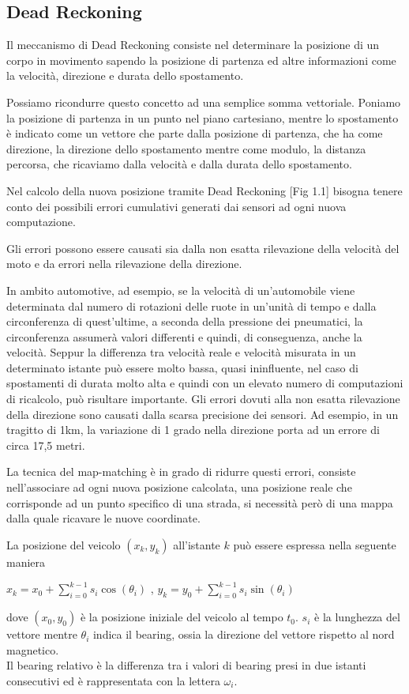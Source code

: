 \documentclass[12pt,a4paper,openright,twoside]{report}
\begin{document}
\subsection{Dead Reckoning}
Il meccanismo di Dead Reckoning consiste nel determinare la posizione di un corpo in movimento sapendo la posizione di partenza ed altre informazioni come la velocità, direzione e durata dello spostamento.

Possiamo ricondurre questo concetto ad una semplice somma vettoriale. Poniamo la posizione di partenza in un punto nel piano cartesiano, mentre lo spostamento è indicato come un vettore che parte dalla posizione di partenza, che ha come direzione, la direzione dello spostamento mentre come modulo, la distanza percorsa, che ricaviamo dalla velocità e dalla durata dello spostamento.

Nel calcolo della nuova posizione tramite Dead Reckoning [Fig 1.1] bisogna tenere conto dei possibili errori cumulativi generati dai sensori ad ogni nuova computazione. 

Gli errori possono essere causati sia dalla non esatta rilevazione della velocità del moto e da errori nella rilevazione della direzione.

In ambito automotive, ad esempio, se la velocità di un'automobile viene determinata dal numero di rotazioni delle ruote in un'unità di tempo e dalla circonferenza di quest'ultime, a seconda della pressione dei pneumatici, la circonferenza assumerà valori differenti e quindi, di conseguenza, anche la velocità. 
Seppur la differenza tra velocità reale e velocità misurata in un determinato istante può essere molto bassa, quasi ininfluente, nel caso di spostamenti di durata molto alta e quindi con un elevato numero di computazioni di ricalcolo, può risultare importante.
Gli errori dovuti alla non esatta rilevazione della direzione sono causati dalla scarsa precisione dei sensori. Ad esempio, in un tragitto di 1km, la variazione di 1 grado nella direzione porta ad un errore di circa 17,5 metri.


La tecnica del map-matching \cite{K7} è in grado di ridurre questi errori, consiste nell'associare ad ogni nuova posizione calcolata, una posizione reale che corrisponde ad un punto specifico di una strada, si necessità però di una mappa dalla quale ricavare le nuove coordinate.

La posizione del veicolo $(x_k, y_k)$ all'istante $k$ può essere espressa nella seguente maniera \cite{K8}
\begin{center}
$x_k = x_0 + \sum_{i=0}^{k-1} s_i  \cos( \theta_i) $ ,      $y_k = y_0 + \sum_{i=0}^{k-1} s_i  \sin( \theta_i)  $
\end{center}
dove $(x_0, y_0)$ è la posizione iniziale del veicolo al tempo $t_0 $. $s_i$ è la lunghezza del vettore mentre $ \theta_i $ indica il bearing, ossia la direzione del vettore rispetto al nord magnetico.\\
Il bearing relativo è la differenza tra i valori di bearing presi in due istanti consecutivi ed è rappresentata con la lettera $\omega_i $.
\end{document}
